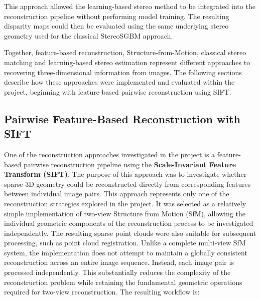 This approach allowed the learning-based stereo method to be integrated into the reconstruction pipeline without performing model training. The resulting disparity maps could then be evaluated using the same underlying stereo geometry used for the classical StereoSGBM approach. 

Together, feature-based reconstruction, Structure-from-Motion, classical stereo matching and learning-based stereo estimation represent different approaches to recovering three-dimensional information from images. The following sections describe how these approaches were implemented and evaluated within the project, beginning with feature-based pairwise reconstruction using SIFT.

\subsection{Pairwise Feature-Based Reconstruction with SIFT}

One of the reconstruction approaches investigated in the project is a
feature-based pairwise reconstruction pipeline using the
\textbf{Scale-Invariant Feature Transform (SIFT)}. The purpose of this
approach was to investigate whether sparse 3D geometry could be reconstructed
directly from corresponding features between individual image pairs. This approach represents only one of the reconstruction strategies explored
in the project. It was selected as a relatively simple implementation of
two-view Structure from Motion (SfM), allowing the individual geometric
components of the reconstruction process to be investigated independently.
The resulting sparse point clouds were also suitable for subsequent
processing, such as point cloud registration. Unlike a complete multi-view SfM system, the implementation does not attempt
to maintain a globally consistent reconstruction across an entire image
sequence. Instead, each image pair is processed independently. This
substantially reduces the complexity of the reconstruction problem while
retaining the fundamental geometric operations required for two-view
reconstruction.
The resulting workflow is:

